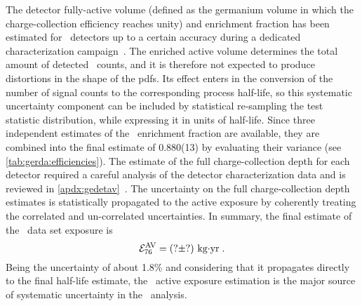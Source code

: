 \begin{description}[wide]
  \item[\gesix\ active exposure] The detector fully-active volume (defined
    as the germanium volume in which the charge-collection efficiency reaches unity) and
    enrichment fraction has been estimated for \bege\ detectors up to a certain accuracy
    during a dedicated characterization campaign~\cite{Agostini2015e, Agostini2019}. The
    enriched active volume determines the total amount of detected \nnbb\ counts, and it
    is therefore not expected to produce distortions in the shape of the pdfs. Its effect
    enters in the conversion of the number of signal counts to the corresponding process
    half-life, so this systematic uncertainty component can be included by statistical
    re-sampling the test statistic distribution, while expressing it in units of
    half-life.
    \newpar
    Since three independent estimates of the \bege\ enrichment fraction are
    available\cite{Agostini2015e}, they are combined into the final estimate of 0.880(13)
    by evaluating their variance (see \cref{tab:gerda:efficiencies}). The estimate of the
    full charge-collection depth for each detector required a careful analysis of the
    detector characterization data and is reviewed in
    \cref{apdx:gedetav}~\cite{Agostini2019, Lehnert2016}. The uncertainty on the full
    charge-collection depth estimates is statistically propagated to the active exposure
    by coherently treating the correlated and un-correlated uncertainties. In summary, the
    final estimate of the \enrBEGeII\ data set exposure is
    \[
      \mathcal{E}_{76}^\text{AV} = (? \pm ?)~\text{{kg$\cdot$yr}} \;.
    \]
    Being the uncertainty of about 1.8\% and considering that it propagates directly
    to the final half-life estimate, the \gesix\ active exposure estimation is the major
    source of systematic uncertainty in the \nnbb\ analysis.


\end{description}
